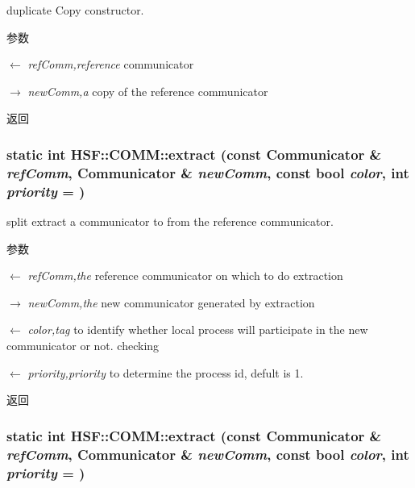 duplicate Copy constructor. 
\begin{DoxyParams}{参数}
\item[\mbox{$\leftarrow$} {\em refComm,reference}]communicator \item[\mbox{$\rightarrow$} {\em newComm,a}]copy of the reference communicator \end{DoxyParams}
\begin{DoxyReturn}{返回}

\end{DoxyReturn}
\hypertarget{classHSF_1_1COMM_a098fb0d3618c3ff9cd18f25eed6c8c25}{
\subsubsection[{extract}]{\setlength{\rightskip}{0pt plus 5cm}static int HSF::COMM::extract (const {\bf Communicator} \& {\em refComm}, \/  {\bf Communicator} \& {\em newComm}, \/  const bool {\em color}, \/  int {\em priority} = {})}}
\label{classHSF_1_1COMM_a098fb0d3618c3ff9cd18f25eed6c8c25}


split extract a communicator to from the reference communicator. 
\begin{DoxyParams}{参数}
\item[\mbox{$\leftarrow$} {\em refComm,the}]reference communicator on which to do extraction \item[\mbox{$\rightarrow$} {\em newComm,the}]new communicator generated by extraction \item[\mbox{$\leftarrow$} {\em color,tag}]to identify whether local process will participate in the new communicator or not. checking \item[\mbox{$\leftarrow$} {\em priority,priority}]to determine the process id, defult is 1. \end{DoxyParams}
\begin{DoxyReturn}{返回}

\end{DoxyReturn}
\hypertarget{classHSF_1_1COMM_a098fb0d3618c3ff9cd18f25eed6c8c25}{
\subsubsection[{extract}]{\setlength{\rightskip}{0pt plus 5cm}static int HSF::COMM::extract (const {\bf Communicator} \& {\em refComm}, \/  {\bf Communicator} \& {\em newComm}, \/  const bool {\em color}, \/  int {\em priority} = {})}}
\label{classHSF_1_1COMM_a098fb0d3618c3ff9cd18f25eed6c8c25}


